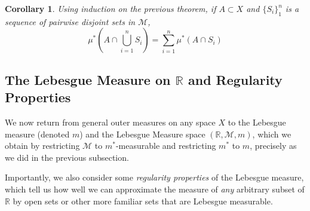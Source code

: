 \documentclass[12pt]{article}
\theoremstyle{plain}
\newtheorem{cor}[thm]{Corollary}
\theoremstyle{definition}
\theoremstyle{remark}
\begin{document}
\begin{cor}
Using induction on the previous theorem, if $A\subset X$ and $\{S_i\}^n_1$ is a sequence of pairwise disjoint sets in $\mathscr{M}$, 
\[
    \mu^*\left(A \cap \bigcup^n_{i=1} S_i \right)
    = \sum^n_{i=1} \mu^*(A \cap S_i)
\]
\end{cor}

\subsection{The Lebesgue Measure on $\mathbb{R}$ and Regularity Properties}

We now return from general outer measures on any space $X$ to the Lebesgue measure (denoted $m$) and the Lebesgue Measure space $(\mathbb{R},\mathscr{M},m)$, which we obtain by restricting $\mathscr{M}$ to $m^*$-measurable and restricting $m^*$ to $m$, precisely as we did in the previous subsection.

Importantly, we also consider some \emph{regularity properties} of the Lebesgue measure, which tell us how well we can approximate the measure of \emph{any} arbitrary subset of $\mathbb{R}$ by open sets or other more familiar sets that are Lebesgue measurable.
\end{document}
